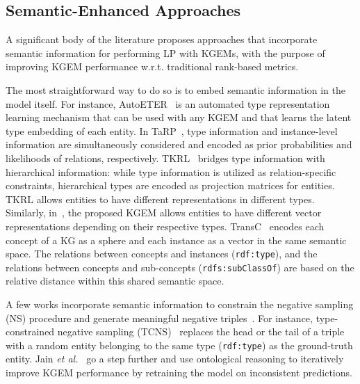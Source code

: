 \documentclass[letterpaper]{article} %
\begin{document}
\subsection{Semantic-Enhanced Approaches}\label{related-work:semantic}
A significant body of the literature proposes approaches that incorporate semantic information for performing LP with KGEMs, with the purpose of improving KGEM performance w.r.t. traditional rank-based metrics. 

The most straightforward way to do so is to embed semantic information in the model itself. For instance, AutoETER~\cite{autoeter} is an automated type representation learning mechanism that can be used with any KGEM and that learns the latent type embedding of each entity. In TaRP~\cite{tarp}, type information and instance-level information are simultaneously considered and encoded as prior probabilities and likelihoods of relations, respectively.
TKRL~\cite{tkrl} bridges type information with hierarchical information: while type information is utilized as relation-specific constraints, hierarchical types are encoded as projection matrices for entities. TKRL allows entities to have different representations in different types. Similarly, in~\cite{transet}, the proposed KGEM allows entities to have different vector representations depending on their respective types. TransC~\cite{transc} encodes each concept of a KG as a sphere and each instance as a vector in the same semantic space. The relations between concepts and instances (\texttt{rdf:type}), and the relations between concepts and sub-concepts (\texttt{rdfs:subClassOf}) are based on the relative distance within this shared semantic space.

A few works incorporate semantic information to constrain the negative sampling (NS) procedure and generate meaningful negative triples~\cite{krompas,jain_iswc,weyns}. For instance, type-constrained negative sampling (TCNS)~\cite{krompas} replaces the head or the tail of a triple with a random entity belonging to the same type (\texttt{rdf:type}) as the ground-truth entity. Jain \textit{et al.}~\cite{jain_iswc} go a step further and use ontological reasoning to iteratively improve KGEM performance by retraining the model on inconsistent predictions.
\end{document}
